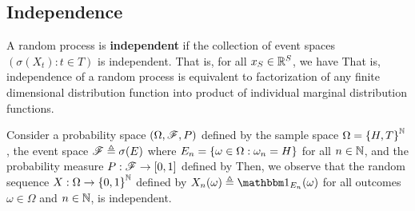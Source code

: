 \documentclass[letterpaper,10pt,english]{article}
\begin{document}
\subsection{Independence}
\begin{defn} 
A random process is \textbf{independent} if the collection of event spaces $(\sigma(X_t): t \in T)$ is independent. 
That is, for all $x_S \in \mathbb{R}^S$, we have 
That is, independence of a random process is equivalent to factorization of any finite dimensional distribution function into product of individual marginal distribution functions.
\end{defn}
\begin{shaded}
\begin{exmp}
Consider a probability space $(\Omega,\mathscr{F}, P)$ defined by the sample space $\Omega = \left\{H,T\right\}^{\mathbb{N}}$, the event space $\mathscr{F} \triangleq \sigma(E)$ where $E_n = \left\{\omega \in \Omega: \omega_n = H\right\}$ for all $n\in\mathbb{N}$, 
and the probability measure $P: \mathscr{F} \to [0,1]$ defined by 
Then, we observe that the random sequence $X: \Omega\to\left\{0,1\right\}^{\mathbb{N}}$ defined by $X_n(\omega) \triangleq \Ind{E_n}(\omega)$ for all outcomes $\omega \in \Omega$ and $n \in \mathbb{N}$, is independent.
\end{exmp}
\end{shaded}
\end{document}
